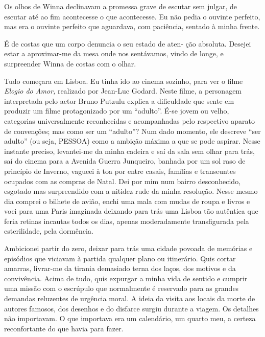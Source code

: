 Os olhos de Winna declinavam a promessa grave de escutar sem julgar, de
escutar até ao fim acontecesse o que acontecesse. Eu não pedia o ouvinte
perfeito, mas era o ouvinte perfeito que aguardava, com paciência,
sentado à minha frente.

É de costas que um corpo denuncia o seu estado de aten- ção absoluta.
Desejei estar a aproximar-me da mesa onde nos sentávamos, vindo de
longe, e surpreender Winna de costas com o olhar.

Tudo começara em Lisboa. Eu tinha ido ao cinema sozinho, para ver o
filme \emph{Elogio do Amor, }realizado por Jean-Luc Godard.
Neste filme, a personagem interpretada pelo actor Bruno Putzulu explica
a dificuldade que sente em produzir um filme protagonizado por um
``adulto''. É-se jovem ou velho, categorias universalmente
reconhecidas e acompanhadas pelo respectivo aparato de convenções; mas
como ser um ``adulto''? Num dado momento, ele descreve ``ser adulto''
(ou seja, PESSOA) como a ambição máxima a que se pode aspirar. Nesse
instante preciso, levantei-me da minha cadeira e saí da sala sem olhar
para trás, saí do cinema para a Avenida Guerra Junqueiro, banhada por
um sol raso de princípio de Inverno, vagueei à toa por entre casais,
famílias e transeuntes ocupados com as compras de Natal. Dei por mim num
bairro desconhecido, esgotado mas surpreendido com a nitidez rude da
minha resolução. Nesse mesmo dia comprei o bilhete de avião, enchi uma
mala com mudas de roupa e livros e voei para uma Paris imaginada
deixando para trás uma Lisboa tão autêntica que feria retinas incautas
todos os dias, apenas moderadamente transfigurada pela esterilidade,
pela dormência.

Ambicionei partir do zero, deixar para trás uma cidade povoada de
memórias e episódios que viciavam à partida qualquer plano ou
itinerário. Quis cortar amarras, livrar-me da tirania demasiado terna
dos laços, dos motivos e da convivência. Acima de tudo, quis expurgar
a minha vida de sentido e cumprir uma missão com o escrúpulo que
normalmente é reservado para as grandes demandas reluzentes de urgência
moral. A ideia da visita aos locais da morte de autores famosos, dos
desenhos e do disfarce surgiu durante a viagem. Os detalhes não
importavam. O que importava era um calendário, um quarto meu, a
certeza reconfortante do que havia para fazer.

